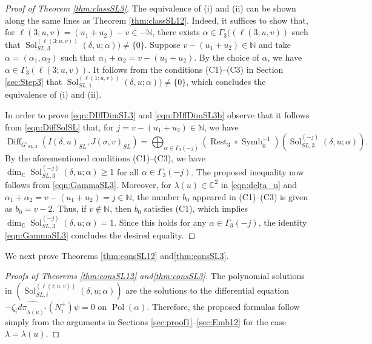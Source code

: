 \documentclass[a4paper,11pt,reqno]{amsart}
\newcommand{\0}{{\bf 0}}
\newcommand{\N}{\mathbb{N}}
\newcommand{\C}{\mathbb{C}}
\newcommand{\1}{{\bf 1}}
\DeclareMathOperator{\Pol}{Pol}
\DeclareMathOperator{\Diff}{Diff}
\DeclareMathOperator{\Sol}{Sol}
\DeclareMathOperator{\Symb}{Symb}
\DeclareMathOperator{\Rest}{Rest}
\theoremstyle{plain}
\theoremstyle{definition}
\numberwithin{equation}{section}
\theoremstyle{definition}
\begin{document}
\begin{proof}[Proof of Theorem \ref{thm:classSL3}]
The equivalence of (i) and (ii) can be shown along the same lines as
Theorem \ref{thm:classSL12}. Indeed, it suffices to show that,
for $\ell(3;u,v)=(u_1+u_2)-v \in -\N$, there exists 
$\alpha \in \Gamma_3((\ell(3;u,v))$ such that
$\Sol_{SL,3}^{(\ell(3;u,v))}(\delta, u;\alpha)) \neq \{0\}$.
Suppose $v-(u_1+u_2) \in \N$ and 
take $\alpha=(\alpha_1,\alpha_2)$ such that 
$\alpha_1+\alpha_2=v-(u_1+u_2)$.
By the choice of $\alpha$, we have $\alpha \in \Gamma_3(\ell(3;u,v))$. 
It follows from the conditions (C1)--(C3) in Section \ref{sec:Step3} 
that $\Sol_{SL,1}^{(\ell(1;u,v))}(\delta, u;\alpha)) \neq \{0\}$,
which concludes the equivalence of (i) and (ii).

In order to prove \eqref{eqn:DIffDimSL3} and \eqref{eqn:DIffDimSL3b} observe that 
it follows from  \eqref{eqn:DiffSolSL} that, for $j=v-(u_1+u_2) \in\N$, we have 
\begin{equation}\label{eqn:DIffDimSL3c} 
\Diff_{G'_{SL,3}}(I(\delta,u)_{SL}, J(\sigma,v)_{SL})
=\bigoplus_{\alpha\in\Gamma_3(-j)}
(\Rest_3 \circ \Symb_0^{-1})(\Sol_{SL,3}^{(-j)}(\delta, u;\alpha)).
\end{equation}
By the aforementioned conditions (C1)--(C3), we have 
$\dim_\C\Sol_{SL,3}^{(-j)}(\delta, u;\alpha)\geq 1$ for 
all $\alpha \in \Gamma_3(-j)$.
The proposed inequality now follows from \eqref{eqn:GammaSL3}.
Moreover, for $\lambda(u) \in \C^2$ in \eqref{eqn:delta_u} and 
$\alpha_1+\alpha_2=v-(u_1+u_2)=j \in \N$,
the number $b_0$ appeared in (C1)--(C3) is given as $b_0=v-2$.
Thus, if $v \notin \N$, then $b_0$ satisfies (C1), which implies  
$\dim_\C\Sol_{SL,3}^{(-j)}(\delta, u;\alpha)= 1$. Since this holds for any 
$\alpha \in \Gamma_3(-j)$, the identity \eqref{eqn:GammaSL3} 
concludes the desired equality.
\end{proof}

We next prove Theorems \ref{thm:consSL12} and\ref{thm:consSL3}.

\begin{proof}[Proofs of Theorems \ref{thm:consSL12} and\ref{thm:consSL3}]
The polynomial solutions in $(\Sol_{SL,i}^{(\ell(i;u,v))}(\delta, u;\alpha))$
are the solutions to the differential equation
$-\zeta_i\widehat{d\pi_{\lambda(u)^*}}(N_i^+)\psi = 0$
on $\Pol(\alpha)$. Therefore, the proposed formulas follow simply from the 
arguments in Sections \ref{sec:proof1}--\ref{sec:Emb12} for 
the case $\lambda = \lambda(u)$.
\end{proof}
\end{document}
